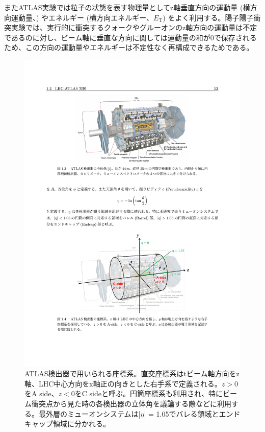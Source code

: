 またATLAS実験では粒子の状態を表す物理量としてz軸垂直方向の運動量 (横方向運動量、\pt) やエネルギー (横方向エネルギー、$E_{\mathrm{T}}$) をよく利用する。陽子陽子衝突実験では、実行的に衝突するクォークやグルーオンのz軸方向の運動量は不定であるのに対し、ビーム軸に垂直な方向に関しては運動量の和が0で保存されるため、この方向の運動量やエネルギーは不定性なく再構成できるためである。
\begin{figure} 
\centering
\includegraphics[width=16cm]{fig/Intro/ATLAScordination.pdf}
\caption[ATLAS検出器における座標系]{ATLAS検出器で用いられる座標系。直交座標系はtビーム軸方向をz軸、LHC中心方向をx軸正の向きとした右手系で定義される。$z>0$をA side、$z<0$をC sideと呼ぶ。円筒座標系も利用され、特にビーム衝突点から見た時の各検出器の立体角を議論する際などに利用する。最外層のミューオンシステムは|$\eta$| = 1.05でバレる領域とエンドキャップ領域に分かれる。}
\label{ATLAScordination}
\end{figure}

